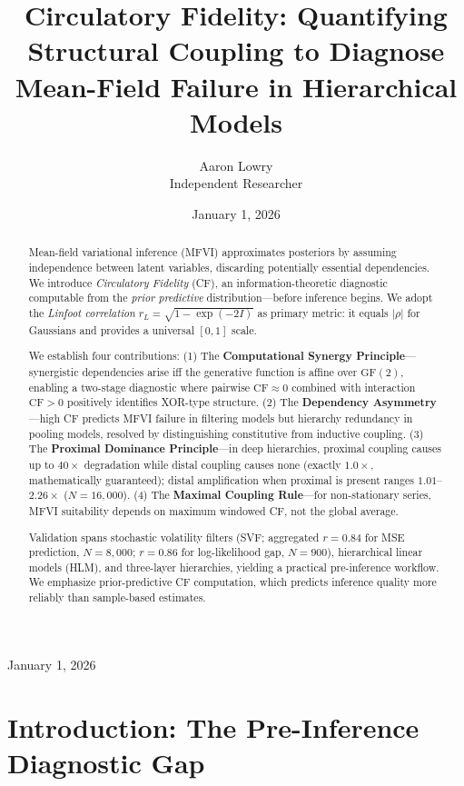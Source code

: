 \documentclass[10pt]{article} %
\title{Circulatory Fidelity: Quantifying Structural Coupling to Diagnose Mean-Field Failure in Hierarchical Models}
\author{\name Aaron Lowry \\
      \addr Independent Researcher}
\date{January 1, 2026}
\theoremstyle{plain}
\theoremstyle{definition}
\newcommand{\CF}{\mathrm{CF}}
\begin{document}
\maketitle

\begin{center}
{\large January 1, 2026}
\end{center}
\vspace{-1em}

\begin{abstract}
Mean-field variational inference (MFVI) approximates posteriors by assuming independence between latent variables, discarding potentially essential dependencies. We introduce \emph{Circulatory Fidelity} (CF), an information-theoretic diagnostic computable from the \emph{prior predictive} distribution---before inference begins. We adopt the \emph{Linfoot correlation} $r_L = \sqrt{1 - \exp(-2I)}$ as primary metric: it equals $|\rho|$ for Gaussians and provides a universal $[0,1]$ scale.

We establish four contributions: (1) The \textbf{Computational Synergy Principle}---synergistic dependencies arise iff the generative function is affine over $\text{GF}(2)$, enabling a two-stage diagnostic where pairwise $\CF \approx 0$ combined with interaction $\CF > 0$ positively identifies XOR-type structure. (2) The \textbf{Dependency Asymmetry}---high CF predicts MFVI failure in filtering models but hierarchy redundancy in pooling models, resolved by distinguishing constitutive from inductive coupling. (3) The \textbf{Proximal Dominance Principle}---in deep hierarchies, proximal coupling causes up to $40\times$ degradation while distal coupling causes none (exactly $1.0\times$, mathematically guaranteed); distal amplification when proximal is present ranges $1.01$--$2.26\times$ ($N = 16{,}000$). (4) The \textbf{Maximal Coupling Rule}---for non-stationary series, MFVI suitability depends on maximum windowed CF, not the global average.

Validation spans stochastic volatility filters (SVF; aggregated $r = 0.84$ for MSE prediction, $N = 8{,}000$; $r = 0.86$ for log-likelihood gap, $N = 900$), hierarchical linear models (HLM), and three-layer hierarchies, yielding a practical pre-inference workflow. We emphasize prior-predictive CF computation, which predicts inference quality more reliably than sample-based estimates.
\end{abstract}

\section{Introduction: The Pre-Inference Diagnostic Gap}
\label{sec:intro}
\end{document}

